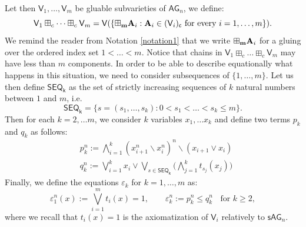 \documentclass{amsart}
\theoremstyle{definition}
\numberwithin{equation}{section}
\newcommand{\join}{\vee}
\newcommand{\alg}[1]{{\textbf{\upshape #1}}}  %
\newcommand{\vv}[1]{\mathsf {#1}}
\newcommand{\BG}{\vv{AG}}
\newcommand{\ssBG}{\vv{sAG}}
\begin{document}
Let then $\vv V_1, \ldots, \vv V_m$ be gluable subvarieties of $\BG_n$, we define: 
\begin{equation}
	\vv V_1 \boxplus_c \dots  \boxplus_c \vv V_m =\vv V (\{ \boxplus_{\bf m} \alg  A_i : \alg A_i \in (\vv V_i)_{\vv c} \mbox{ for every } i= 1, \dots , m \}).
\end{equation}
We remind the reader from Notation \ref{notation1} that we write $\boxplus_{\bf m} \alg A_i$ for a gluing over the ordered index set $1 < \ldots < m$. 
Notice that chains in $\vv V_1 \boxplus_c \dots  \boxplus_c \vv V_m$ may have less than $m$ components. In order to be able to describe equationally what happens in this situation, we need to consider subsequences of $\{1, \ldots, m\}$.
Let us then define $\vv{SEQ_k}$ as the set of strictly increasing sequences of $k$ natural numbers between $1$ and $m$, i.e. 
$$
\vv{SEQ_k} = \{s=(s_1, \dots , s_k) : 0 < s_1< \dots < s_k \leq m \}.
$$
Then for each $k=2, \dots m$, we consider $k$ variables $x_1, \dots x_k$ and define two terms $p_k$ and $q_k$ as follows: 
\begin{align*}
	& p_k^n := \bigwedge_{i=1}^{k}(x_{i+1}^n \backslash x_i^n)^n \backslash (x_{i+1}\join x_i)\\
	& q_k^n := \bigvee_{i=1}^k x_i \join \bigvee_{s \in \vv{SEQ_k}} \Biggl ( \bigwedge_{j=1}^kt_{s_j}(x_j) \Biggr) 
\end{align*}
Finally, we define the equations $\varepsilon_k$ for $k=1, \dots , m$ as:
\begin{equation}
	\varepsilon_1^n(x):= \bigvee_{i=1}^m t_i(x)=1, \qquad \varepsilon_k^n:= p_k^n \leq q_k^n \;\; \mbox{ for } k \geq 2,
\end{equation}
where we recall that $t_i(x) = 1$ is the axiomatization of $\vv V_i$ relatively to $\ssBG_n$.
\end{document}
